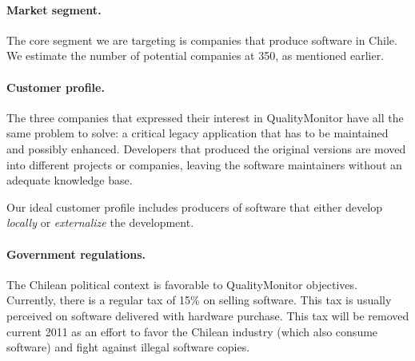 \documentclass[runningheads]{llncs}
\begin{document}
\paragraph{Market segment. } The core segment we are targeting is companies that produce software in Chile. We estimate the number of potential companies at 350, as mentioned earlier. 




\paragraph{Customer profile.} The three companies that expressed their interest in QualityMonitor have all the same problem to solve: a critical legacy application that has to be maintained and possibly enhanced. Developers that produced the original versions are moved into different projects or companies, leaving the software maintainers without an adequate knowledge base. 

Our ideal customer profile includes producers of software that either develop \emph{locally} or \emph{externalize} the development. 

\paragraph{Government regulations.} The Chilean political context is favorable to QualityMonitor objectives.
Currently, there is a regular tax of 15\% on selling software. This tax is usually perceived on software delivered with hardware purchase. This tax will be removed current 2011 as an effort to favor the Chilean industry (which also consume software) and fight against illegal software copies.
\end{document}
